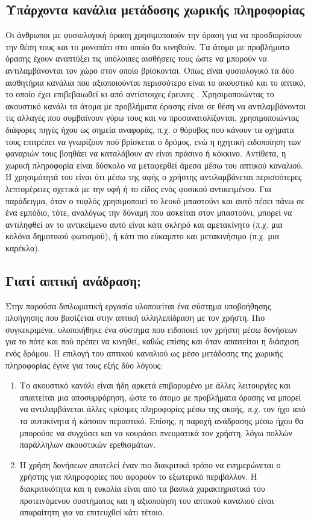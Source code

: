 \subsection{Υπάρχοντα κανάλια μετάδοσης χωρικής πληροφορίας}
Οι άνθρωποι με φυσιολογική όραση χρησιμοποιούν την όραση για να προσδιορίσουν την θέση τους και το μονοπάτι στο οποίο θα κινηθούν. Τα άτομα με προβλήματα όρασης έχουν αναπτύξει τις υπόλοιπες αισθήσεις τους ώστε να μπορούν να αντιλαμβάνονται τον χώρο στον οποίο βρίσκονται. Όπως είναι φυσιολογικό τα δύο αισθητήρια κανάλια που αξιοποιούνται περισσότερο είναι το ακουστικό και το απτικό, το οποίο έχει επιβεβαιωθεί κι από αντίστοιχες έρευνες \cite{schmidt2013spatial}. Χρησιμοποιώντας το ακουστικό κανάλι τα άτομα με προβλήματα όρασης είναι σε θέση να αντιλαμβάνονται τις αλλαγές που συμβαίνουν γύρω τους και να προσανατολίζονται, χρησιμοποιώντας διάφορες πηγές ήχου ως σημεία αναφοράς, π.χ. ο θόρυβος που κάνουν τα οχήματα τους επιτρέπει να γνωρίζουν πού βρίσκεται ο δρόμος, ενώ η ηχητική ειδοποίηση των φαναριών τους βοηθάει να καταλάβουν αν είναι πράσινο ή κόκκινο. Αντίθετα, η χωρική πληροφορία είναι δύσκολο να μεταφερθεί άμεσα μέσω του απτικού καναλιού. Η χρησιμότητά του είναι ότι μέσω της αφής ο χρήστης αντιλαμβάνεται περισσότερες λεπτομέρειες σχετικά με την υφή ή το είδος ενός φυσικού αντικειμένου. Για παράδειγμα, όταν ο τυφλός χρησιμοποιεί το λευκό μπαστούνι και αυτό πέσει πάνω σε ένα εμπόδιο, τότε, αναλόγως την δύναμη που ασκείται στον μπαστούνι, μπορεί να αντιληφθεί αν το αντικείμενο αυτό είναι κάτι σκληρό και αμετακίνητο (π.χ. μια κολόνα δημοτικού φωτισμού), ή κάτι πιο εύκαμπτο και μετακινήσιμο (π.χ. μια καρέκλα).

\subsection{Γιατί απτική ανάδραση;}
Στην παρούσα διπλωματική εργασία υλοποιείται ένα σύστημα υποβοήθησης πλοήγησης που βασίζεται στην απτική αλληλεπίδραση με τον χρήστη. Πιο συγκεκριμένα, υλοποιήθηκε ένα σύστημα που ειδοποιεί τον χρήστη μέσω δονήσεων για το πότε και πού πρέπει να κινηθεί, καθώς επίσης και όταν απαιτείται η διάσχιση ενός δρόμου. Η επιλογή του απτικού καναλιού ως μέσο μετάδοσης της χωρικής πληροφορίας έγινε για τους εξής δύο λόγους:
\begin{enumerate}
    \item Το ακουστικό κανάλι είναι ήδη αρκετά επιβαρυμένο με άλλες λειτουργίες \cite{bharadwaj2017tactile, shingledecker1978human} και απαιτείται μια αποσυμφόρηση, ώστε το άτομο με προβλήματα όρασης να μπορεί να αντιλαμβάνεται άλλες κρίσιμες πληροφορίες μέσω της ακοής, π.χ. τον ήχο από τα αυτοκίνητα ή κάποιον περαστικό. Επίσης, η παροχή ανάδρασης μέσω ήχου θα μπορούσε να συγχύσει και να κουράσει πνευματικά τον χρήστη, λόγω πολλών παράλληλων ακουστικών ερεθισμάτων.
    \item Η χρήση δονήσεων αποτελεί έναν πιο διακριτικό τρόπο να ενημερώνεται ο χρήστης για πληροφορίες που αφορούν το εξωτερικό περιβάλλον. Η διακριτικότητα και η ευκολία είναι από τα βασικά χαρακτηριστικά του προτεινόμενου συστήματος και η αξιοποίηση του απτικού καναλιού είναι απαραίτητη για να επιτευχθεί κάτι τέτοιο.
\end{enumerate}

